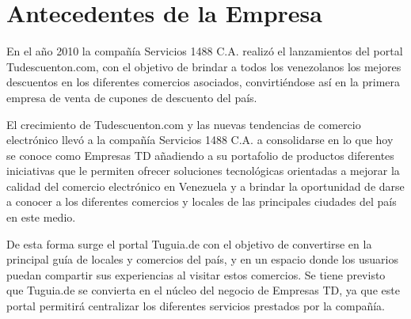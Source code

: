 \section{Antecedentes de la Empresa} \label{sect:Antecedentes_empresa}

En el año 2010 la compañía Servicios 1488 C.A. realizó el lanzamientos del portal Tudescuenton.com, con el objetivo de brindar a todos los venezolanos los mejores 
descuentos en los diferentes comercios asociados, convirtiéndose así en la primera 
empresa de venta de cupones de descuento del país.

El crecimiento de Tudescuenton.com y las nuevas tendencias de comercio electrónico 
llevó a la compañía Servicios 1488 C.A. a consolidarse en lo que hoy se conoce 
como Empresas TD añadiendo a su portafolio de productos diferentes iniciativas 
que le permiten ofrecer soluciones tecnológicas orientadas a mejorar la calidad del 
comercio electrónico en Venezuela y a brindar la oportunidad de darse a conocer a los diferentes comercios y locales de las principales ciudades del país en este medio.

De esta forma surge el portal Tuguia.de con el objetivo de convertirse en la principal 
guía de locales y comercios del país, y en un espacio donde los usuarios puedan compartir 
sus experiencias al visitar estos comercios. Se tiene previsto que Tuguia.de se convierta
en el núcleo del negocio de Empresas TD, ya que este portal permitirá centralizar los
diferentes servicios prestados por la compañía. 


